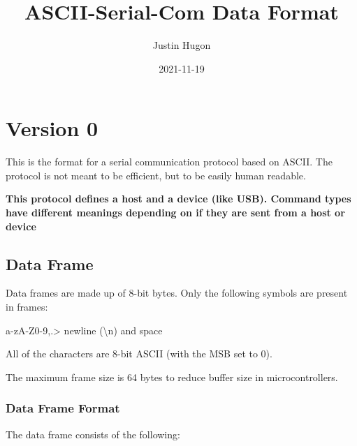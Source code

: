 \documentclass{customdocclass}
\title{ASCII-Serial-Com Data Format}
\author{Justin Hugon}
\date{2021-11-19}
\begin{document}
\maketitle

\section{Version 0}


This is the format for a serial communication protocol based on ASCII. The
protocol is not meant to be efficient, but to be easily human readable.

\textbf{This protocol defines a host and a device (like USB). Command types
have different meanings depending on if they are sent from a host or device}

\subsection{Data Frame}

Data frames are made up of 8-bit bytes. Only the following symbols are present in frames:

\vspace{1em}

a-zA-Z0-9,.> newline (\textbackslash n) and space

\vspace{1em}

All of the characters are 8-bit ASCII (with the MSB set to 0).

The maximum frame size is 64 bytes to reduce buffer size in microcontrollers.

\subsubsection{Data Frame Format}

The data frame consists of the following:
\end{document}
